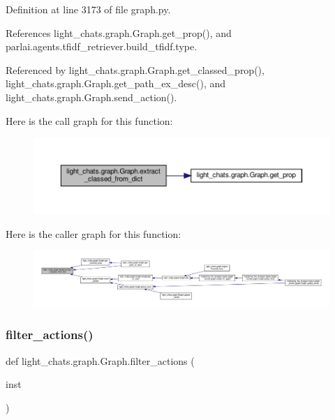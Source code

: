 Definition at line 3173 of file graph.\+py.



References light\+\_\+chats.\+graph.\+Graph.\+get\+\_\+prop(), and parlai.\+agents.\+tfidf\+\_\+retriever.\+build\+\_\+tfidf.\+type.



Referenced by light\+\_\+chats.\+graph.\+Graph.\+get\+\_\+classed\+\_\+prop(), light\+\_\+chats.\+graph.\+Graph.\+get\+\_\+path\+\_\+ex\+\_\+desc(), and light\+\_\+chats.\+graph.\+Graph.\+send\+\_\+action().

Here is the call graph for this function\+:
\nopagebreak
\begin{figure}[H]
\begin{center}
\leavevmode
\includegraphics[width=350pt]{classlight__chats_1_1graph_1_1Graph_a4b2f6d6d7714ea3b82ff7a01f3199123_cgraph}
\end{center}
\end{figure}
Here is the caller graph for this function\+:
\nopagebreak
\begin{figure}[H]
\begin{center}
\leavevmode
\includegraphics[width=350pt]{classlight__chats_1_1graph_1_1Graph_a4b2f6d6d7714ea3b82ff7a01f3199123_icgraph}
\end{center}
\end{figure}
\mbox{\label{classlight__chats_1_1graph_1_1Graph_a27cddf5bb9b3718a70a66ac91c22cf96}} 
\subsubsection{\texorpdfstring{filter\+\_\+actions()}{filter\_actions()}}
{\footnotesize\ttfamily def light\+\_\+chats.\+graph.\+Graph.\+filter\+\_\+actions (\begin{DoxyParamCaption}\item[{}]{inst }\end{DoxyParamCaption})\hspace{0.3cm}{\ttfamily [static]}}




